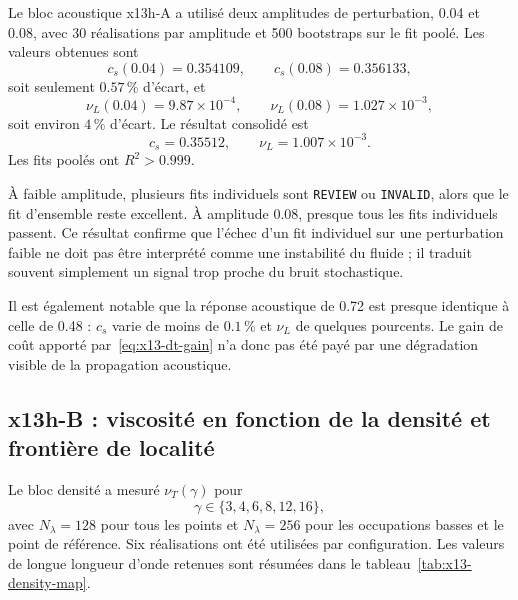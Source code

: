 \documentclass[11pt,a4paper]{article}
\begin{document}
Le bloc acoustique x13h-A a utilisé deux amplitudes de perturbation, 0.04 et 0.08, avec 30 réalisations par amplitude et 500 bootstraps sur le fit poolé. Les valeurs obtenues sont
\begin{equation}
  c_s(0.04)=0.354109,
  \qquad
  c_s(0.08)=0.356133,
\end{equation}
soit seulement $0.57\,\%$ d'écart, et
\begin{equation}
  \nu_L(0.04)=9.87\times10^{-4},
  \qquad
  \nu_L(0.08)=1.027\times10^{-3},
\end{equation}
soit environ $4\,\%$ d'écart. Le résultat consolidé est
\begin{equation}
  \boxed{
  c_s=0.35512,
  \qquad
  \nu_L=1.007\times10^{-3}.
  }
  \label{eq:x13-final-acoustic}
\end{equation}
Les fits poolés ont $R^2>0.999$.

À faible amplitude, plusieurs fits individuels sont \texttt{REVIEW} ou \texttt{INVALID}, alors que le fit d'ensemble reste excellent. À amplitude 0.08, presque tous les fits individuels passent. Ce résultat confirme que l'échec d'un fit individuel sur une perturbation faible ne doit pas être interprété comme une instabilité du fluide ; il traduit souvent simplement un signal trop proche du bruit stochastique.

Il est également notable que la réponse acoustique de 0.72 est presque identique à celle de 0.48 : $c_s$ varie de moins de $0.1\,\%$ et $\nu_L$ de quelques pourcents. Le gain de coût apporté par~\eqref{eq:x13-dt-gain} n'a donc pas été payé par une dégradation visible de la propagation acoustique.

\subsection{x13h-B : viscosité en fonction de la densité et frontière de localité}

Le bloc densité a mesuré $\nu_T(\gamma)$ pour
\begin{equation}
  \gamma\in\{3,4,6,8,12,16\},
\end{equation}
avec $N_\lambda=128$ pour tous les points et $N_\lambda=256$ pour les occupations basses et le point de référence. Six réalisations ont été utilisées par configuration. Les valeurs de longue longueur d'onde retenues sont résumées dans le tableau~\ref{tab:x13-density-map}.
\end{document}
